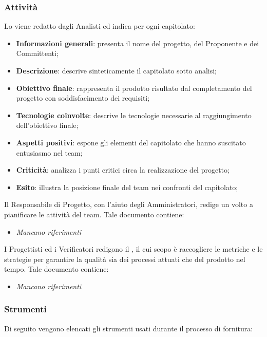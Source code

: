         \subsubsection{Attività}
        Lo \SdF{} viene redatto dagli Analisti ed indica per ogni capitolato:
        \begin{itemize}
            \item{\textbf{Informazioni generali}: presenta il nome del progetto, del Proponente e dei Committenti;}
            \item{\textbf{Descrizione}: descrive sinteticamente il capitolato sotto analisi;}
            \item{\textbf{Obiettivo finale}: rappresenta il prodotto risultato dal completamento del progetto con soddisfacimento dei requisiti;}
            \item{\textbf{Tecnologie coinvolte}: descrive le tecnologie necessarie al raggiungimento dell'obiettivo finale;}
            \item{\textbf{Aspetti positivi}: espone gli elementi del capitolato che hanno suscitato entusiasmo nel team;}
            \item{\textbf{Criticità}: analizza i punti critici circa la realizzazione del progetto;}
            \item{\textbf{Esito}: illustra la posizione finale del team nei confronti del capitolato;}
        \end{itemize}
        
        Il Responsabile di Progetto, con l'aiuto degli Amministratori, redige un \PdP{} volto a pianificare le attività del team. Tale documento contiene:
        \begin{itemize}
        		\item{\textit{Mancano riferimenti}}
        \end{itemize}
        
        I Progettisti ed i Verificatori redigono il \PdQ{}, il cui scopo è raccogliere le metriche e le strategie per garantire la qualità sia dei processi attuati che del prodotto nel tempo. Tale documento contiene:
        \begin{itemize}
        		\item{\textit{Mancano riferimenti}}
        \end{itemize}
        
        \subsubsection{Strumenti}
        Di seguito vengono elencati gli strumenti usati durante il processo di fornitura:
        
